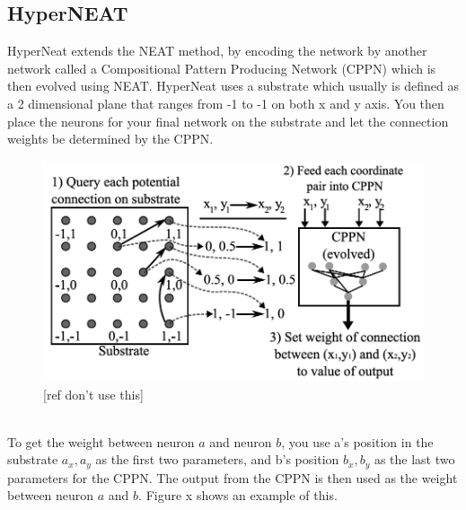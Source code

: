 \documentclass[11pt, a4paper]{article}
\begin{document}
\subsection{HyperNEAT}
HyperNeat extends the NEAT method, by encoding the network by another network called a Compositional Pattern Producing Network (CPPN) which is then evolved using NEAT. HyperNeat uses a substrate which usually is defined as a 2 dimensional plane that ranges from -1 to -1 on both x and y axis. You then place the neurons for your final network on the substrate and let the connection weights be determined by the CPPN.
\begin{figure}[!ht]
\centering
\includegraphics[scale=0.3]{HyperNeatSubstrate}
\caption{[ref don't use this]}
\end{figure}
\\
To get the weight between neuron $ a $ and neuron $ b $, you use a's position in the substrate $a_x, a_y$ as the first two parameters, and b's position $ b_x, b_y $ as the last two parameters for the CPPN. The output from the CPPN is then used as the weight between neuron $ a $ and $ b $. Figure x shows an example of this.
\end{document}
